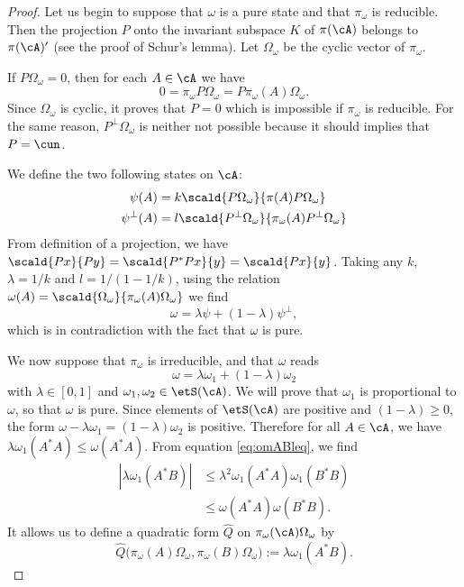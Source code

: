 \begin{proof}
	Let us begin to suppose that $\omega$ is a pure state and that $\pi_{\omega}$ is reducible. Then the projection $P$ onto the invariant subspace $K$ of $\pi(\cA)$ belongs to $\pi(\cA)'$ (see the proof of Schur's lemma). Let $\Omega_{\omega}$ be the cyclic vector of $\pi_{\omega}$.

	If $P\Omega_{\omega}=0$, then for each $A\in\cA$ we have
	\[
		0=\pi_{\omega}P\Omega_{\omega}=P\pi_{\omega}(A)\Omega_{\omega}.
	\]
	Since $\Omega_{\omega}$ is cyclic, it proves that $P=0$ which is impossible if $\pi_{\omega}$ is reducible. For the same reason, $P^{\perp}\Omega_{\omega}$ is neither not possible because it should implies that $P=\cun$.

	We define the two following states on $\cA$:
	\begin{subequations}
		\begin{align}
			\psi(A)         & =k\scald{ P\Omega_{\omega} }{ \pi(A)P\Omega_{\omega} }                          \\
			\psi^{\perp}(A) & =l\scald{ P^{\perp}\Omega_{\omega} }{ \pi_{\omega}(A)P^{\perp}\Omega_{\omega} }
		\end{align}
	\end{subequations}
	From definition of a projection, we have $\scald{ Px }{ Py }=\scald{ P^*Px }{ y }=\scald{ Px }{ y }$. Taking any $k$, $\lambda=1/k$ and $l=1/(1-1/k)$, using the relation $\omega(A)=\scald{ \Omega_{\omega} }{ \pi_{\omega}(A)\Omega_{\omega} }$ we find
	\[
		\omega=\lambda\psi+(1-\lambda)\psi^{\perp},
	\]
	which is in contradiction with the fact that $\omega$ is pure.

	We now suppose that $\pi_{\omega}$ is irreducible, and that $\omega$ reads
	\[
		\omega=\lambda\omega_1+(1-\lambda)\omega_2
	\]
	with $\lambda\in[0,1]$ and $\omega_1,\omega_2\in\etS(\cA)$. We will prove that $\omega_1$ is proportional to $\omega$, so that $\omega$ is pure. Since elements of $\etS(\cA)$ are positive and $(1-\lambda)\geq0$, the form $\omega-\lambda\omega_1=(1-\lambda)\omega_2$ is positive. Therefore for all $A\in\cA$, we have $\lambda\omega_1(A^*A)\leq\omega(A^*A)$. From equation \eqref{eq:omABleq}, we find
	\begin{equation} \label{eq_r19031}
		\begin{split}
			| \lambda\omega_1(A^*B) |&\leq\lambda^2\omega_1(A^*A)\omega_1(B^*B)\\
			&\leq\omega(A^*A)\omega(B^*B).
		\end{split}
	\end{equation}
	It allows us to define a quadratic form $\hat Q$ on $\pi_{\omega}(\cA)\Omega_{\omega}$ by
	\begin{equation}
		\hat Q\big( \pi_{\omega}(A)\Omega_{\omega},\pi_{\omega}(B)\Omega_{\omega} \big):=\lambda\omega_1(A^*B).
	\end{equation}


\end{proof}
